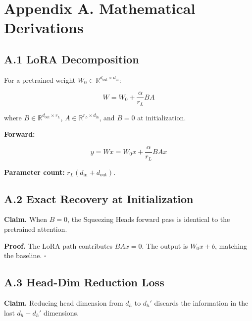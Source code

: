 
\section{Appendix A. Mathematical Derivations}

\subsection{A.1 LoRA Decomposition}

For a pretrained weight $W_0 \in \mathbb{R}^{d_\text{out} \times d_\text{in}}$:

\begin{equation}
W = W_0 + \frac{\alpha}{r_L} B A
\end{equation}

where $B \in \mathbb{R}^{d_\text{out} \times r_L}$, $A \in \mathbb{R}^{r_L \times d_\text{in}}$, and $B = 0$ at initialization.

\textbf{Forward:}

\begin{equation}
y = W x = W_0 x + \frac{\alpha}{r_L} B A x
\end{equation}

\textbf{Parameter count:} $r_L (d_\text{in} + d_\text{out})$.

\subsection{A.2 Exact Recovery at Initialization}

\textbf{Claim.} When $B = 0$, the Squeezing Heads forward pass is identical to 
the pretrained attention.

\textbf{Proof.} The LoRA path contributes $B A x = 0$. The output is $W_0 x + b$, 
matching the baseline. $\square$

\subsection{A.3 Head-Dim Reduction Loss}

\textbf{Claim.} Reducing head dimension from $d_h$ to $d_h'$ discards the 
information in the last $d_h - d_h'$ dimensions.


